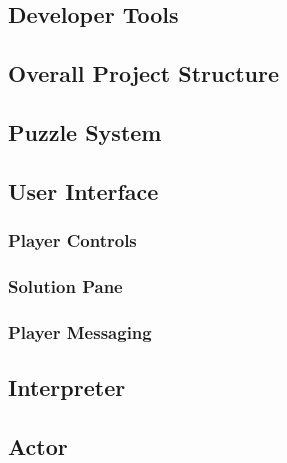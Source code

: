 \subsection{Developer Tools}

\newpage

\subsection{Overall Project Structure}

\newpage

\subsection{Puzzle System}

\newpage


\subsection{User Interface}
\subsubsection{Player Controls}
\subsubsection{Solution Pane}
\subsubsection{Player Messaging}
\newpage


\subsection{Interpreter}

\newpage

\subsection{Actor}

\newpage